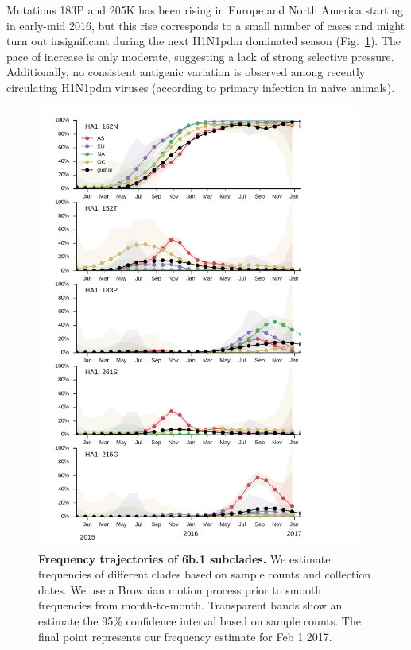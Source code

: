 \documentclass[11pt,oneside,letterpaper]{article}
\begin{document}
\pagebreak

Mutations 183P and 205K has been rising in Europe and North America starting in early-mid 2016, but this rise corresponds to a small number of cases and might turn out insignificant during the next H1N1pdm dominated season (Fig.\ \ref{H1N1pdm_mutations}). The pace of increase is only moderate, suggesting a lack of strong selective pressure. Additionally, no consistent antigenic variation is observed among recently circulating H1N1pdm viruses (according to primary infection in naive animals).

\begin{figure}[H]
	\centering
	\includegraphics[width=0.95\textwidth]{../figures/feb-2017/h1n1pdm_frequencies.pdf}
	\caption{\textbf{Frequency trajectories of 6b.1 subclades.}
	We estimate frequencies of different clades based on sample counts and collection dates.
	We use a Brownian motion process prior to smooth frequencies from month-to-month.
	Transparent bands show an estimate the 95\% confidence interval based on sample counts.
	The final point represents our frequency estimate for Feb 1 2017.
	}
	\label{H1N1pdm_mutations}
\end{figure}
\end{document}
